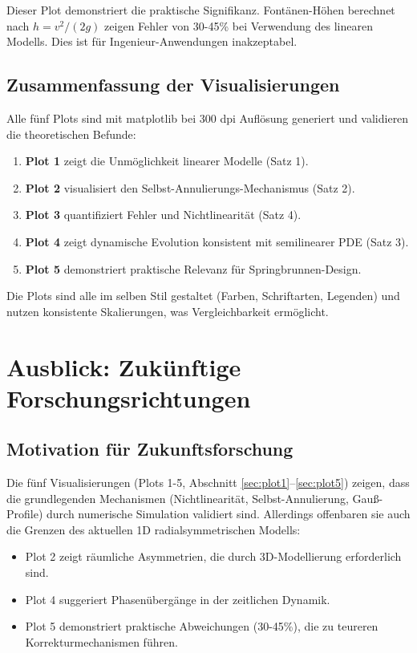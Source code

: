 \documentclass[a4paper,12pt]{article}
\theoremstyle{definition}
\begin{document}
Dieser Plot demonstriert die praktische Signifikanz. Fontänen-Höhen berechnet nach $h = v^2/(2g)$ zeigen Fehler von 30-45\% bei Verwendung des linearen Modells. Dies ist für Ingenieur-Anwendungen inakzeptabel.

\subsection{Zusammenfassung der Visualisierungen}

Alle fünf Plots sind mit matplotlib bei 300 dpi Auflösung generiert und validieren die theoretischen Befunde:

\begin{enumerate}
	\item \textbf{Plot 1} zeigt die Unmöglichkeit linearer Modelle (Satz 1).
	\item \textbf{Plot 2} visualisiert den Selbst-Annulierungs-Mechanismus (Satz 2).
	\item \textbf{Plot 3} quantifiziert Fehler und Nichtlinearität (Satz 4).
	\item \textbf{Plot 4} zeigt dynamische Evolution konsistent mit semilinearer PDE (Satz 3).
	\item \textbf{Plot 5} demonstriert praktische Relevanz für Springbrunnen-Design.
\end{enumerate}

Die Plots sind alle im selben Stil gestaltet (Farben, Schriftarten, Legenden) und nutzen konsistente Skalierungen, was Vergleichbarkeit ermöglicht.

\section{Ausblick: Zukünftige Forschungsrichtungen}

\subsection{Motivation für Zukunftsforschung}

Die fünf Visualisierungen (Plots 1-5, Abschnitt \ref{sec:plot1}--\ref{sec:plot5}) zeigen, dass die grundlegenden Mechanismen (Nichtlinearität, Selbst-Annulierung, Gauß-Profile) durch numerische Simulation validiert sind. Allerdings offenbaren sie auch die Grenzen des aktuellen 1D radialsymmetrischen Modells:

\begin{itemize}
	\item Plot 2 zeigt räumliche Asymmetrien, die durch 3D-Modellierung erforderlich sind.
	\item Plot 4 suggeriert Phasenübergänge in der zeitlichen Dynamik.
	\item Plot 5 demonstriert praktische Abweichungen (30-45\%), die zu teureren Korrekturmechanismen führen.
\end{itemize}
\end{document}
